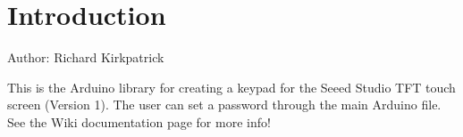 \hypertarget{index_intro_sec}{}\section{Introduction}\label{index_intro_sec}
Author\+: Richard Kirkpatrick

This is the Arduino library for creating a keypad for the Seeed Studio T\+F\+T touch screen (Version 1). The user can set a password through the main Arduino file. See the Wiki documentation page for more info! 